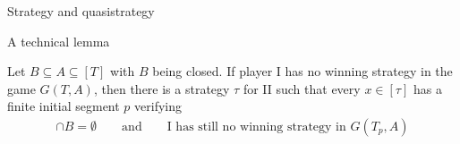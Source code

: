 \documentclass{beamer} %
\begin{document}
\begin{frame}{Strategy and quasistrategy}
        
        \phantom{a}

        \phantom{a}

        \phantom{a}

        \phantom{a}

        \phantom{a}

        \phantom{a}

        \phantom{a}

        \phantom{a}

        \phantom{a}

        \phantom{a}
\end{frame}


\begin{frame}{A technical lemma}
    \begin{lemma}
        Let $B \subseteq A \subseteq [T]$ with $B$ being closed. If player I has no winning strategy in the 
        game $G(T,A)$, then there is a strategy $\tau$ for II such that every $x \in [\tau]$ has a finite 
        initial segment $p$ verifying \begin{align*}
            [T_p] \cap B = \emptyset \qquad \text{and} \qquad \text{I has still no winning strategy in }G(T_p,A) 
        \end{align*} 
    \end{lemma}
\end{frame}
\end{document}
